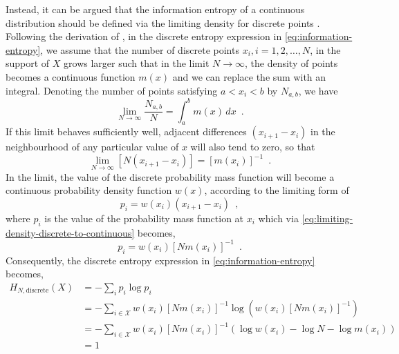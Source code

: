 Instead, it can be argued that the information entropy of a continuous distribution should be defined via the limiting density for discrete points \cite{jaynes_information_1957,jaynes_prior_1968}. Following the derivation of \textcite{jaynes_information_1957}, in the discrete entropy expression in \cref{eq:information-entropy}, we assume that the number of discrete points $x_i, i=1,2,\dots,N$, in the support of $X$ grows larger such that in the limit $N\rightarrow\infty$, the density of points becomes a continuous function $m(x)$ and we can replace the sum with an integral. Denoting the number of points satisfying $a<x_i<b$ by $N_{a,b}$, we have
%
\begin{equation}
    \lim_{N\rightarrow\infty} \frac{N_{a,b}}{N} = \int_a^b m(x) \, dx \enspace .
\end{equation}
%
If this limit behaves sufficiently well, adjacent differences $(x_{i+1} - x_{i})$ in the neighbourhood of any particular value of $x$ will also tend to zero, so that
%
\begin{equation} \label{eq:limiting-density-discrete-to-continuous}
    \lim_{N\rightarrow\infty} \left[ N(x_{i+1} - x_{i}) \right] = \left[ m(x_{i}) \right]^{-1} \enspace .
\end{equation}
%
In the limit, the value of the discrete probability mass function will become a continuous probability density function $w(x)$, according to the limiting form of
%
\begin{equation}
    p_i = w(x_i)\left(x_{i+1} - x_{i}\right) \enspace ,
\end{equation}
%
where $p_i$ is the value of the probability mass function at $x_i$ which via \cref{eq:limiting-density-discrete-to-continuous} becomes,
%
\begin{equation}
    p_i = w(x_i)\left[Nm(x_i)\right]^{-1} \enspace .
\end{equation}
%
Consequently, the discrete entropy expression in \cref{eq:information-entropy} becomes,
%
\begin{align}
    H_{N,\text{discrete}}(X) &= - \sum_{i} p_i \log p_i \nonumber \\
    &= - \sum_{i\in\mathcal{X}} w(x_i)\left[Nm(x_i)\right]^{-1} \log \left( w(x_i)\left[Nm(x_i)\right]^{-1} \right) \nonumber \\
    &= - \sum_{i\in\mathcal{X}} w(x_i)\left[Nm(x_i)\right]^{-1} (\log w(x_i) - \log N - \log m(x_i)) \nonumber  \\
    &= 1
\end{align}

